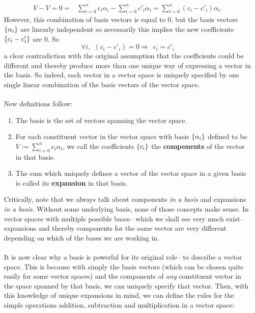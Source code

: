 $$
\begin{aligned}
V - V = 0= &\sum_{i=0}^{n}c_{i}\alpha_{i}-\sum_{i=0}^{n}c'_{i}\alpha_{i}=\sum_{i=0}^{n}(c_{i}-c'_{i})\alpha_{i}.
\end{aligned}
$$
However, this combination of basis vectors is equal to ${0}$, but the basis vectors $\{\alpha_{i}\}$ are linearly independent so necessarily this implies the new coefficients $\{c_{i}-c'_{i}\}$ are $0$. So
$$
\forall i, \:\: (c_{i}-c'_{i})=0 \Rightarrow\:\: c_{i} = c'_{i}
$$
a clear contradiction with the original assumption that the coefficients could be different and thereby produce more than one unique way of expressing a vector in the basis. So indeed, each vector in a vector space is uniquely specified by one single linear combination of the basis vectors of the vector space. 
\\\\
New definitions follow:
\begin{enumerate}
    \item The basis is the set of vectors spanning the vector space.
    \item For each constituent vector in the vector space with basis $\{\alpha_{i}\}$ defined to be $V:=\sum_{i=0}^{n}c_{i}\alpha_{i}$, we call the coefficients $\{c_{i}\}$ the \textbf{components} of the vector in that basis.
    \item The sum which uniquely defines a vector of the vector space in a given basis is called its \textbf{expansion} in that basis.
\end{enumerate}
Critically, note that we always talk about components \textit{in a basis} and expansions \textit{in a basis}. Without some underlying basis, none of those concepts make sense. In vector spaces with multiple possible bases-- which we shall see very much exist-- expansions and thereby components for the same vector are very different depending on which of the bases we are working in.
\\\\
It is now clear why a basis is powerful for its original role-- to describe a vector space. This is because with simply the basis vectors (which can be chosen quite easily for some vector spaces) and the components of \textit{any} constituent vector in the space spanned by that basis, we can uniquely specify that vector. Then, with this knowledge of unique expansions in mind, we can define the rules for the simple operations addition, subtraction and multiplication in a vector space:
\\\\
